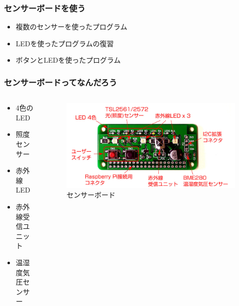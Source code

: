 \begin{frame}
  \frametitle{センサーボードを使う}
  \begin{itemize}
    \item 複数のセンサーを使ったプログラム
    \item LEDを使ったプログラムの復習
    \item ボタンとLEDを使ったプログラム
  \end{itemize}
\end{frame}

\begin{frame}
  \frametitle{センサーボードってなんだろう}
  \begin{columns}
    \begin{column}{0.48\textwidth}
      \begin{itemize}
        \item 4色のLED
        \item 照度センサー
        \item 赤外線LED
        \item 赤外線受信ユニット
        \item 温湿度気圧センサー
      \end{itemize}
    \end{column}
    \begin{column}{0.48\textwidth}
      \begin{figure}
        \centering

        \includegraphics[width=1.0\textwidth]{../images/chap03/sensors_name.png}
        \caption{センサーボード}
      \end{figure}
    \end{column}
  \end{columns}
\end{frame}

